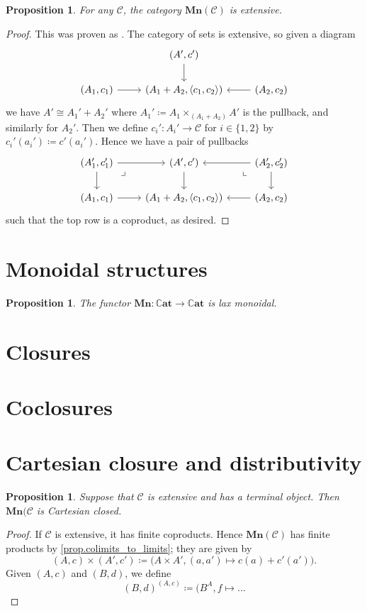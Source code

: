 \documentclass[11pt, one side, article]{memoir}
\theoremstyle{definition}
\theoremstyle{plain}
\newtheorem{proposition}[definitionx]{Proposition}
\DeclarePairedDelimiter{\pair}{\langle}{\rangle}
\newcommand{\cat}[1]{\mathcal{#1}}%
\newcommand{\Cat}[1]{\mathbf{#1}}%
\newcommand{\smcat}{\mathbb{C}\Cat{at}}
\newcommand{\0}{\textsf{0}}
\newcommand{\1}{\tn{\textsf{1}}}
\newcommand{\2}{\tn{\textsf{2}}}
\newcommand{\3}{\tn{\textsf{3}}}
\newcommand{\4}{\tn{\textsf{4}}}
\newcommand{\5}{\tn{\textsf{5}}}
\newcommand{\6}{\tn{\textsf{6}}}
\newcommand{\7}{\tn{\textsf{7}}}
\newcommand{\8}{\tn{\textsf{8}}}
\newcommand{\9}{\tn{\textsf{9}}}
\newcommand{\mn}{\Cat{Mn}}
\begin{document}
\begin{proposition}
For any $\cat{C}$, the category $\mn(\cat{C})$ is extensive.
\end{proposition}
\begin{proof}
This was proven as \cite[Proposition 2.4]{carboni1993introduction}. The category of sets is extensive, so given a diagram
\[
\begin{tikzcd}
	&(A',c')\ar[d]\\
	(A_1,c_1)\ar[r]&(A_1+A_2,\pair{c_1,c_2})&(A_2,c_2)\ar[l]
\end{tikzcd}
\]
we have $A'\cong A_1'+A_2'$ where $A_1'\coloneqq A_1\times_{(A_1+A_2)}A'$ is the pullback, and similarly for $A_2'$. Then we define $c_i'\colon A_i'\to \cat{C}$ for $i\in\{1,2\}$ by $c_i'(a_i')\coloneqq c'(a_i')$.
 Hence we have a pair of pullbacks
\[
\begin{tikzcd}
	(A'_1,c'_1)\ar[r]\ar[d]\ar[dr, phantom, very near start, "\lrcorner"]&
	(A',c')\ar[d]&
	(A'_2,c'_2)\ar[l]\ar[d]\ar[dl, phantom, very near start, "\llcorner"]
	\\
	(A_1,c_1)\ar[r]&(A_1+A_2,\pair{c_1,c_2})&(A_2,c_2)\ar[l]
\end{tikzcd}
\]
such that the top row is a coproduct, as desired.
\end{proof}




\section{Monoidal structures}

\begin{proposition}
The functor $\mn\colon\smcat\to\smcat$ is lax monoidal.
\end{proposition}

\section{Closures}
\section{Coclosures}

\section{Cartesian closure and distributivity}

\begin{proposition}
Suppose that $\cat{C}$ is extensive and has a terminal object. Then $\mn(\cat{C}$ is Cartesian closed.
\end{proposition}
\begin{proof}
If $\cat{C}$ is extensive, it has finite coproducts. Hence $\mn(\cat{C})$ has finite products by \cref{prop.colimits_to_limits}; they are given by
\[
(A,c)\times (A',c')\coloneqq\big(A\times A', (a,a')\mapsto c(a)+c'(a')\big).
\]
Given $(A,c)$ and $(B,d)$, we define
\[
(B,d)^{(A,c)}\coloneqq(B^A, f\mapsto ...
\]
\end{proof}
\end{document}
